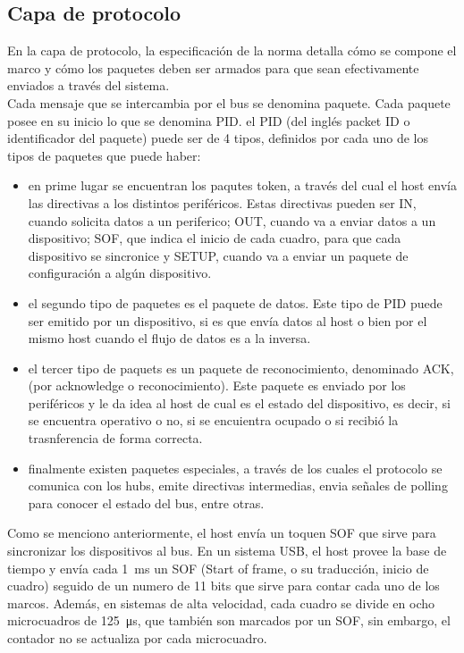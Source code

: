 \subsection{Capa de protocolo}
	En la capa de protocolo, la especificación de la norma detalla cómo se compone el marco y cómo los paquetes deben ser armados para que sean efectivamente enviados a través del sistema.\\
	
	Cada mensaje que se intercambia por el bus se denomina paquete. Cada paquete posee en su inicio lo que se denomina PID. el PID (del inglés packet ID o identificador del paquete) puede ser de 4 tipos, definidos por cada uno de los tipos de paquetes que puede haber: 
	\begin{itemize}
		\item en prime lugar se encuentran los paqutes token, a través del cual el host envía las directivas a los distintos periféricos. Estas directivas pueden ser IN, cuando solicita datos a un periferico; OUT, cuando va a enviar datos a un dispositivo; SOF, que indica el inicio de cada cuadro, para que cada dispositivo se sincronice y SETUP, cuando va a enviar un paquete de configuración a algún dispositivo.
		\item el segundo tipo de paquetes es el paquete de datos. Este tipo de PID puede ser emitido por un dispositivo, si es que envía datos al host o bien por el mismo host cuando el flujo de datos es a la inversa.
		\item el tercer tipo de paquets es un paquete de reconocimiento, denominado ACK, (por acknowledge o reconocimiento). Este paquete es enviado por los periféricos y le da idea al host de cual es el estado del dispositivo, es decir, si se encuentra operativo o no, si se encuientra ocupado o si recibió la trasnferencia de forma correcta.
		\item finalmente existen paquetes especiales, a través de los cuales el protocolo se comunica con los hubs, emite directivas intermedias, envia señales de polling para conocer el estado del bus, entre otras.
	\end{itemize}
	
	Como se menciono anteriormente, el host envía un toquen SOF que sirve para sincronizar los dispositivos al bus. En un sistema USB, el host provee la base de tiempo y envía cada \SI{1}{\milli\second} un SOF (Start of frame, o su traducción, inicio de cuadro) seguido de un numero de 11 bits que sirve para contar cada uno de los marcos. Además, en sistemas de alta velocidad, cada cuadro se divide en ocho microcuadros de \SI{125}{\micro\second}, que también son marcados por un SOF, sin embargo, el contador no se actualiza por cada microcuadro.\\
	
